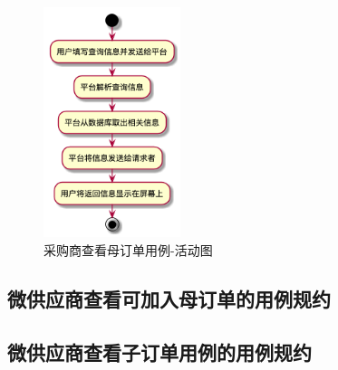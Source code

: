 \begin{figure}[htp]
    \centering
    \includegraphics[width=4cm]{image/chap01/uc_order_query.png}
    \caption{采购商查看母订单用例-活动图}
    \label{fig:uc_order_query-uml}
\end{figure}


\subsection{微供应商查看可加入母订单的用例规约}


\subsection{微供应商查看子订单用例的用例规约}

